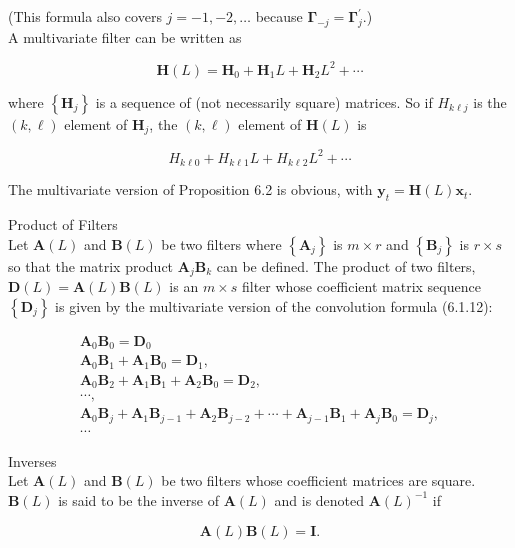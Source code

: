 \documentclass[10pt]{article}
\begin{document}
(This formula also covers $j=-1,-2, \ldots$ because $\boldsymbol{\Gamma}_{-j}=\boldsymbol{\Gamma}_{j}^{\prime}$.)\\
A multivariate filter can be written as

$$
\mathbf{H}(L)=\mathbf{H}_{0}+\mathbf{H}_{1} L+\mathbf{H}_{2} L^{2}+\cdots
$$

where $\left\{\mathbf{H}_{j}\right\}$ is a sequence of (not necessarily square) matrices. So if $H_{k \ell j}$ is the\\
$(k, \ell)$ element of $\mathbf{H}_{j}$, the $(k, \ell)$ element of $\mathbf{H}(L)$ is

$$
H_{k \ell 0}+H_{k \ell 1} L+H_{k \ell 2} L^{2}+\cdots
$$

The multivariate version of Proposition 6.2 is obvious, with $\mathbf{y}_{t}=\mathbf{H}(L) \mathbf{x}_{t}$.

Product of Filters\\
Let $\mathbf{A}(L)$ and $\mathbf{B}(L)$ be two filters where $\left\{\mathbf{A}_{j}\right\}$ is $m \times r$ and $\left\{\mathbf{B}_{j}\right\}$ is $r \times s$ so that the matrix product $\mathbf{A}_{j} \mathbf{B}_{k}$ can be defined. The product of two filters, $\mathbf{D}(L)= \mathbf{A}(L) \mathbf{B}(L)$ is an $m \times s$ filter whose coefficient matrix sequence $\left\{\mathbf{D}_{j}\right\}$ is given by the multivariate version of the convolution formula (6.1.12):


\begin{gather*}
\mathbf{A}_{0} \mathbf{B}_{0}=\mathbf{D}_{0} \\
\mathbf{A}_{0} \mathbf{B}_{1}+\mathbf{A}_{1} \mathbf{B}_{0}=\mathbf{D}_{1}, \\
\mathbf{A}_{0} \mathbf{B}_{2}+\mathbf{A}_{1} \mathbf{B}_{1}+\mathbf{A}_{2} \mathbf{B}_{0}=\mathbf{D}_{2}, \\
\cdots, \\
\mathbf{A}_{0} \mathbf{B}_{j}+\mathbf{A}_{1} \mathbf{B}_{j-1}+\mathbf{A}_{2} \mathbf{B}_{j-2}+\cdots+\mathbf{A}_{j-1} \mathbf{B}_{1}+\mathbf{A}_{j} \mathbf{B}_{0}=\mathbf{D}_{j}, \\
\cdots \tag{6.3.5}
\end{gather*}


Inverses\\
Let $\mathbf{A}(L)$ and $\mathbf{B}(L)$ be two filters whose coefficient matrices are square. $\mathbf{B}(L)$ is said to be the inverse of $\mathbf{A}(L)$ and is denoted $\mathbf{A}(L)^{-1}$ if


\begin{equation*}
\mathbf{A}(L) \mathbf{B}(L)=\mathbf{I} . \tag{6.3.6}
\end{equation*}
\end{document}
